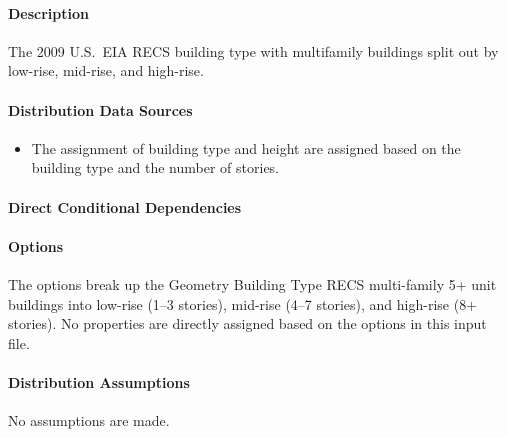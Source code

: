 \paragraph{Description}
% 
The 2009 U.S.~EIA RECS building type with multifamily buildings split out by low-rise, mid-rise, and high-rise.

\paragraph{Distribution Data Sources}
% 
\begin{itemize}
    \item The assignment of building type and height are assigned based on the building type and the number of stories.
\end{itemize}

\paragraph{Direct Conditional Dependencies}


\paragraph{Options}
The options break up the Geometry Building Type RECS multi-family 5+ unit buildings into low-rise (1--3 stories), mid-rise (4--7 stories), and high-rise (8+ stories). No properties are directly assigned based on the options in this input file.



\paragraph{Distribution Assumptions}
% 
No assumptions are made.
